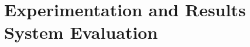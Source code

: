 \chapter{\ifproject%
\ifenglish Experimentation and Results\fi
\else%
\ifenglish System Evaluation\fi
\fi}\label{ch:ifproject}